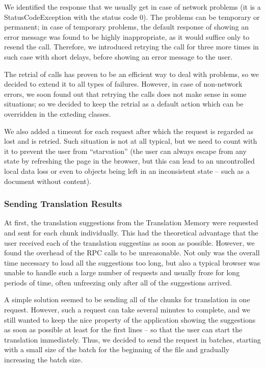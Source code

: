 We identified the response that we usually get in case of network problems (it is a StatusCodeException with the status code 0). The problems can be temporary or permanent; in case of temporary problems, the default response of showing an error message was found to be highly inappropriate, as it would suffice only to resend the call. Therefore, we introduced retrying the call for three more times in such case with short delays, before showing an error message to the user.

The retrial of calls has proven to be an efficient way to deal with problems, so we decided to extend it to all types of failures. However, in case of non-network errors, we soon found out that retrying the calls does not make sense in some situations; so we decided to keep the retrial as a default action which can be overridden in the exteding classes.

We also added a timeout for each request after which the request is regarded as lost and is retried. Such situation is not at all typical, but we need to count with it to prevent the user from ``starvation'' (the user can always escape from any state by refreshing the page in the browser, but this can lead to an uncontrolled local data loss or even to objects being left in an inconsistent state -- such as a document without content).

\subsubsection{Sending Translation Results}

At first, the translation suggestions from the Translation Memory were requested and sent for each chunk individually. This had the theoretical advantage that the user received each of the translation suggestins as soon as possible. However, we found the overhead of the RPC calls to be unreasonable. Not only was the overall time necessary to load all the suggestions too long, but also a typical browser was unable to handle such a large number of requests and usually froze for long periods of time, often unfreezing only after all of the suggestions arrived.

A simple solution seemed to be sending all of the chunks for translation in one request. However, such a request can take several minutes to complete, and we still wanted to keep the nice property of the application showing the suggestions as soon as possible at least for the first lines -- so that the user can start the translation immediately. Thus, we decided to send the request in batches, starting with a small size of the batch for the beginning of the file and gradually increasing the batch size.

